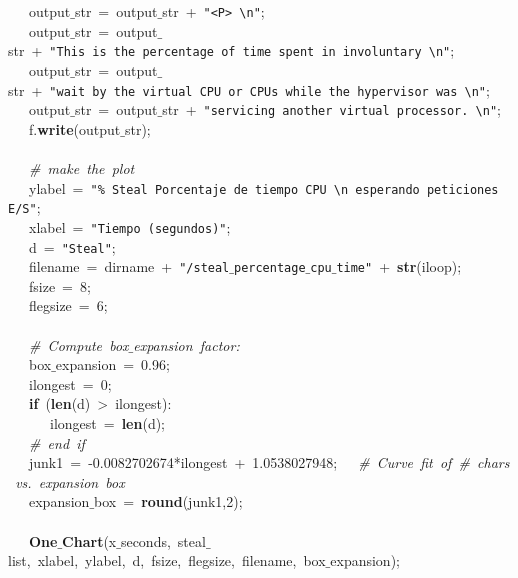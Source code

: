 \mbox{}\ \ \ output$\_$str\ =\ output$\_$str\ +\ \texttt{"{}\textless{}P\textgreater{}\ \textbackslash{}n"{}}; \\
\mbox{}\ \ \ output$\_$str\ =\ output$\_$str\ +\ \texttt{"{}This\ is\ the\ percentage\ of\ time\ spent\ in\ involuntary\ \textbackslash{}n"{}}; \\
\mbox{}\ \ \ output$\_$str\ =\ output$\_$str\ +\ \texttt{"{}wait\ by\ the\ virtual\ CPU\ or\ CPUs\ while\ the\ hypervisor\ was\ \textbackslash{}n"{}}; \\
\mbox{}\ \ \ output$\_$str\ =\ output$\_$str\ +\ \texttt{"{}servicing\ another\ virtual\ processor.\ \textbackslash{}n"{}}; \\
\mbox{}\ \ \ f.\textbf{write}(output$\_$str); \\
\mbox{}\ \ \  \\
\mbox{}\ \ \ \textit{\#\ make\ the\ plot} \\
\mbox{}\ \ \ ylabel\ =\ \texttt{"{}\%\ Steal\ Porcentaje\ de\ tiempo\ CPU\ \textbackslash{}n\ esperando\ peticiones\ E/S"{}}; \\
\mbox{}\ \ \ xlabel\ =\ \texttt{"{}Tiempo\ (segundos)"{}}; \\
\mbox{}\ \ \ d\ =\ \texttt{"{}Steal"{}}; \\
\mbox{}\ \ \ filename\ =\ dirname\ +\ \texttt{"{}/steal$\_$percentage$\_$cpu$\_$time"{}}\ +\ \textbf{str}(iloop); \\
\mbox{}\ \ \ fsize\ =\ 8; \\
\mbox{}\ \ \ flegsize\ =\ 6; \\
\mbox{}\ \ \  \\
\mbox{}\ \ \ \textit{\#\ Compute\ box$\_$expansion\ factor:} \\
\mbox{}\ \ \ box$\_$expansion\ =\ 0.96; \\
\mbox{}\ \ \ ilongest\ =\ 0; \\
\mbox{}\ \ \ \textbf{if}\ (\textbf{len}(d)\ \textgreater{}\ ilongest): \\
\mbox{}\ \ \ \ \ \ ilongest\ =\ \textbf{len}(d); \\
\mbox{}\ \ \ \textit{\#\ end\ if} \\
\mbox{}\ \ \ junk1\ =\ -0.0082702674*ilongest\ +\ 1.0538027948;\ \ \ \textit{\#\ Curve\ fit\ of\ \#\ chars\ vs.\ expansion\ box} \\
\mbox{}\ \ \ expansion$\_$box\ =\ \textbf{round}(junk1,2); \\
\mbox{}\ \ \  \\
\mbox{}\ \ \ \textbf{One$\_$Chart}(x$\_$seconds,\ steal$\_$list,\ xlabel,\ ylabel,\ d,\ fsize,\ flegsize,\ filename,\ box$\_$expansion); \\
